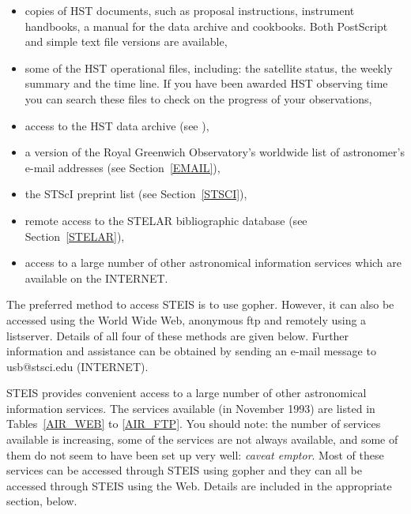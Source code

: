 \documentclass[twoside,11pt,nolof]{starlink}
\begin{document}
\begin{itemize}

  \item copies of HST documents, such as proposal instructions,
   instrument handbooks, a manual for the data archive and cookbooks.
   Both PostScript and simple text file versions are available,

  \item some of the HST operational files, including: the satellite
   status, the weekly summary and the time line. If you have been
   awarded HST observing time you can search these files to check on
   the progress of your observations,

  \item access to the HST data archive (see ),

  \item a version of the Royal Greenwich Observatory's worldwide list
   of astronomer's e-mail addresses (see Section~\ref{EMAIL}),

  \item the STScI preprint list (see Section~\ref{STSCI}),

  \item remote access to the STELAR bibliographic database (see
   Section~\ref{STELAR}),

  \item access to a large number of other astronomical information
   services which are available on the INTERNET.

\end{itemize}

The preferred method to access STEIS is to use gopher. However, it can
also be accessed using the World Wide Web, anonymous ftp and remotely
using a listserver. Details of all four of these methods are given
below. Further information and assistance can be obtained by sending an
e-mail message to usb@stsci.edu (INTERNET).

STEIS provides convenient access to a large number of other astronomical
information services. The services available (in November 1993) are
listed in Tables~\ref{AIR_WEB} to \ref{AIR_FTP}. You should note: the
number of services available is increasing, some of the services are not
always available, and some of them do not seem to have been set up very
well: \textit{caveat emptor}. Most of these services can be accessed
through STEIS using gopher and they can all be accessed through STEIS
using the Web. Details are included in the appropriate section, below.
\end{document}
